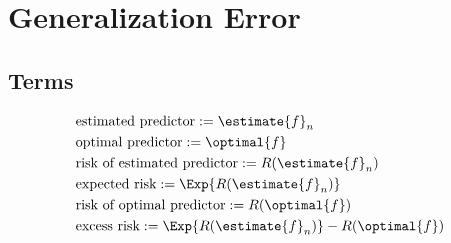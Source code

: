 \documentclass[18pt,a3paper,landscape, ncols=3]{cheatsheet}
\begin{document}
\section{Generalization Error} \seperator
	\subsection{Terms}
		\begin{mdframed}
			\begin{align*}
				& \text{estimated predictor} := \estimate{f}_{n} \\
				& \text{optimal predictor} := \optimal{f} \\
				& \text{risk of estimated predictor} := R(\estimate{f}_{n}) \\
				& \text{expected risk} := \Exp{R(\estimate{f}_{n})} \\
				& \text{risk of optimal predictor} := R(\optimal{f}) \\
				& \text{excess risk} := \Exp{R(\estimate{f}_{n})} - R(\optimal{f})
			\end{align*}
		\end{mdframed}
\end{document}

